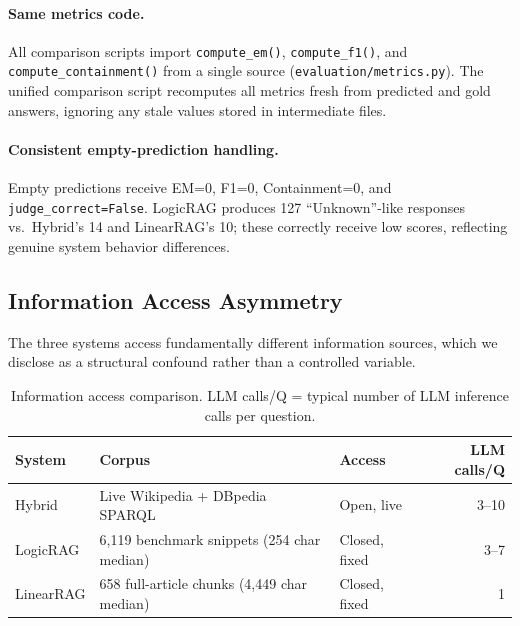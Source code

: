 \paragraph{Same metrics code.}
All comparison scripts import \texttt{compute\_em()}, \texttt{compute\_f1()}, and \texttt{compute\_containment()} from a single source (\texttt{evaluation/metrics.py}). The unified comparison script recomputes all metrics fresh from predicted and gold answers, ignoring any stale values stored in intermediate files.

\paragraph{Consistent empty-prediction handling.}
Empty predictions receive EM=0, F1=0, Containment=0, and \texttt{judge\_correct=False}. LogicRAG produces 127 ``Unknown''-like responses vs.\ Hybrid's 14 and LinearRAG's 10; these correctly receive low scores, reflecting genuine system behavior differences.

\subsection{Information Access Asymmetry}
\label{sec:info-access-asymmetry}

The three systems access fundamentally different information sources, which we disclose as a structural confound rather than a controlled variable.

\begin{table}[h]
\centering
\begin{tabular}{lllr}
\toprule
\textbf{System} & \textbf{Corpus} & \textbf{Access} & \textbf{LLM calls/Q} \\
\midrule
Hybrid & Live Wikipedia + DBpedia SPARQL & Open, live & 3--10 \\
LogicRAG & 6{,}119 benchmark snippets (254 char median) & Closed, fixed & 3--7 \\
LinearRAG & 658 full-article chunks (4{,}449 char median) & Closed, fixed & 1 \\
\bottomrule
\end{tabular}
\caption{Information access comparison. LLM calls/Q = typical number of LLM inference calls per question.}
\label{tab:info-access}
\end{table}

